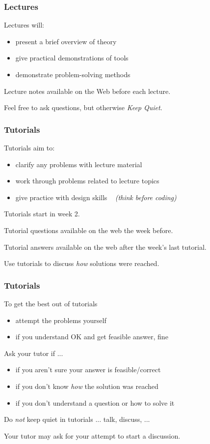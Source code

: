 \begin{frame}
\frametitle{Lectures}
Lectures will:
\begin{itemize}
\item  present a brief overview of theory
\item  give practical demonstrations of tools
\item  demonstrate problem-solving methods
\end{itemize}
Lecture notes available on the Web before each lecture.

Feel free to ask questions, but otherwise {\em{Keep Quiet}}.
\end{frame}

\begin{frame}
\frametitle{Tutorials}
Tutorials aim to:
\begin{itemize}
\item  clarify any problems with lecture material
\item  work through problems related to lecture topics
\item  give practice with design skills ~ {\small {\em{(think before coding)}}}
\end{itemize}

Tutorials start in week 2.

Tutorial questions available on the web the week before.

Tutorial answers available on the web after the week's last tutorial.

Use tutorials to discuss {\em{how}} solutions were reached.
\end{frame}

\begin{frame}
\frametitle{Tutorials}

To get the best out of tutorials

\begin{itemize}
\item  attempt the problems yourself
\item  if you understand OK and get feasible answer, fine
\end{itemize}

Ask your tutor if ...

\begin{itemize}
\item  if you aren't sure your answer is feasible/correct
\item  if you don't know {\em{how}} the solution was reached
\item  if you don't understand a question or how to solve it
\end{itemize}

Do {\em{not}} keep quiet in tutorials ... talk, discuss, ...

Your tutor may ask for your attempt to start a discussion.

\end{frame}


